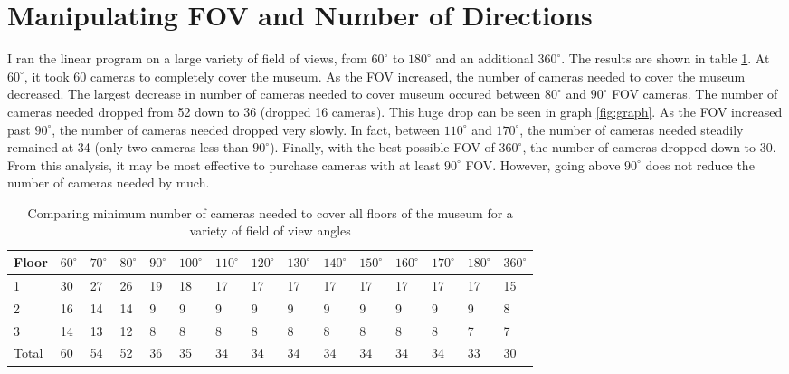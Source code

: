 \documentclass[11pt]{article}
\begin{document}
\section{Manipulating FOV and Number of Directions}
I ran the linear program on a large variety of field of views, from $60^{\circ}$ to $180^{\circ}$ and an additional $360^{\circ}$. The results are shown in table \ref{table:fov}. At $60^{\circ}$, it took 60 cameras to completely cover the museum. As the FOV increased, the number of cameras needed to cover the museum decreased. The largest decrease in number of cameras needed to cover museum occured between $80^{\circ}$ and $90^{\circ}$ FOV cameras. The number of cameras needed dropped from 52 down to 36 (dropped 16 cameras). This huge drop can be seen in graph \ref{fig:graph}. As the FOV increased past $90^{\circ}$, the number of cameras needed dropped very slowly. In fact, between $110^{\circ}$ and $170^{\circ}$, the number of cameras needed steadily remained at 34 (only two cameras less than $90^{\circ}$). Finally, with the best possible FOV of $360^{\circ}$, the number of cameras dropped down to 30. From this analysis, it may be most effective to purchase cameras with at least $90^{\circ}$ FOV. However, going above $90^{\circ}$ does not reduce the number of cameras needed by much.
\begin{table}[H]
\begin{tabular}{|l|l|l|l|l|l|l|l|l|l|l|l|l|l|l|}
\hline
Floor & $60^{\circ}$ & $70^{\circ}$& $80^{\circ}$& $90^{\circ}$ & $100^{\circ}$& $110^{\circ}$& $120^{\circ}$& $130^{\circ}$& $140^{\circ}$& $150^{\circ}$& $160^{\circ}$& $170^{\circ}$& $180^{\circ}$& $360^{\circ}$\\ \hline
1 & 30 & 27& 26&19&18 & 17&17&17&17&17&17&17&17&15\\ \hline
2 & 16 & 14& 14&9&9 & 9&9&9&9&9&9&9&9&8\\ \hline
3 & 14 & 13&12&8 & 8&8&8&8&8&8&8&8&7&7\\ \hline
Total & 60 & 54&52&36&35&34&34&34&34&34&34&34&33&30\\ \hline
\end{tabular}
\caption{\label{table:fov} Comparing minimum number of cameras needed to cover all floors of the museum for a variety of field of view angles}
\end{table}
\end{document}
